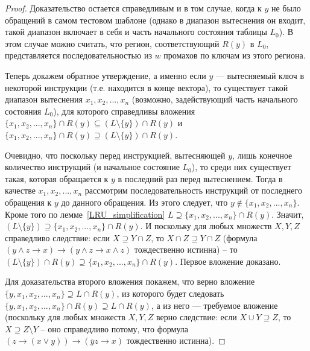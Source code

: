 \begin{proof}
  Доказательство остается справедливым и в том случае, когда к $y$
  не было обращений в самом тестовом шаблоне (однако в диапазон
  вытеснения он входит, такой диапазон включает в себя и часть
  начального состояния таблицы $L_0$). В этом случае
  можно считать, что регион, соответствующий $R(y)$ в $L_0$,
  представляется последовательностью из $w$ промахов по ключам из этого региона.

  Теперь докажем обратное утверждение, а именно если $y$ --- вытесняемый
  ключ в некоторой инструкции (т.е. находится в конце вектора), то
  существует такой диапазон вытеснения $x_1, x_2, ..., x_n$
  (возможно, задействующий часть начального состояния $L_0$), для
  которого справедливы вложения $\{x_1, x_2, ..., x_n\} \cap R(y) \subseteq (L\setminus\{y\}) \cap R(y)$ и $\{x_1, x_2, ..., x_n\} \cap R(y) \supseteq(L\setminus\{y\}) \cap R(y)$.

  Очевидно, что поскольку перед инструкцией, вытесняющей $y$, лишь
  конечное количество инструкций (и начальное состояние $L_0$), то
  среди них существует такая, которая обращается к $y$ в последний
  раз перед вытеснением. Тогда в качестве $x_1, x_2, ..., x_n$
  рассмотрим последовательность инструкций от последнего обращения к
  $y$ до данного обращения. Из этого следует, что $y \notin \{x_1,
  x_2, ..., x_n\}$. Кроме того по лемме~\ref{LRU_simplification} $L
  \supseteq \{x_1, x_2, ..., x_n\} \cap R(y)$. Значит,
  $(L\setminus\{y\}) \supseteq \{x_1, x_2, ..., x_n\} \cap R(y)$. И
  поскольку для любых множеств $X, Y, Z$ справедливо следствие: если
  $X \supseteq Y \cap Z$, то $X\cap Z \supseteq Y \cap Z$ (формула
  $(y \wedge z \rightarrow x) \rightarrow (y \wedge z \rightarrow x
  \wedge z)$ тождественно истинна) -- то $(L\setminus\{y\}) \cap
  R(y) \supseteq \{x_1, x_2, ..., x_n\} \cap R(y)$. Первое вложение
  доказано.

  Для доказательства второго вложения покажем, что верно вложение\\
  $\{y, x_1, x_2, ..., x_n\} \supseteq L \cap R(y)$, из
  которого будет следовать\\ $\{y, x_1, x_2, ..., x_n\} \cap R(y) \supseteq L \cap R(y)$, а из него --- требуемое вложение (поскольку для любых
  множеств $X, Y, Z$ верно следствие: если $X \cup Y\supseteq Z$,
  то $X \supseteq Z \setminus Y$ -- оно справедливо потому, что
  формула $(z \rightarrow (x \vee y))\rightarrow(\overline{y}z\rightarrow x)$
  тождественно истинна).


\end{proof}
